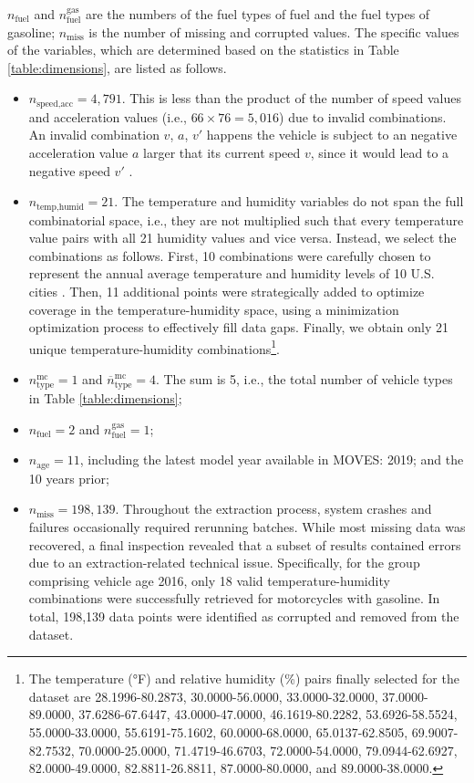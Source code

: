 \documentclass[12pt,english]{article}
\begin{document}
$n_\text{fuel}$ and $n_\text{fuel}^\text{gas}$ are the numbers of the fuel types of fuel and the fuel types of gasoline;
$n_\text{miss}$ is the number of missing and corrupted values.
The specific values of the variables, which are determined based on the statistics in Table \ref{table:dimensions}, are listed as follows.
\begin{itemize}
    \item \(n_\text{speed,acc} = 4,791\). This is less than the product of the number of speed values and acceleration values (i.e., \(66 \times 76 = 5,016\)) due to invalid combinations. An invalid combination $v$, $a$, $v'$ happens the vehicle is subject to an negative acceleration value $a$ larger that its current speed $v$, since it would lead to a negative speed $v'$ . 

    \item \( n_{\text{temp,humid}} = 21 \). The temperature and humidity variables do not span the full combinatorial space, i.e., they are not multiplied such that every temperature value pairs with all 21 humidity values and vice versa.
    Instead, we select the combinations as follows.
    First, 10 combinations were carefully chosen to represent the annual average temperature and humidity levels of 10 U.S. cities \citep{jayawardana2024intersectionzoo}. Then, 11 additional points were strategically added to optimize coverage in the temperature-humidity space, using a minimization optimization process to effectively fill data gaps.
    Finally, we obtain only 21 unique temperature-humidity combinations\footnote{The temperature (°F) and relative humidity (\%) pairs finally selected for the dataset are 28.1996-80.2873, 30.0000-56.0000, 33.0000-32.0000, 37.0000-89.0000, 37.6286-67.6447, 43.0000-47.0000, 46.1619-80.2282, 53.6926-58.5524, 55.0000-33.0000, 55.6191-75.1602, 60.0000-68.0000, 65.0137-62.8505, 69.9007-82.7532, 70.0000-25.0000, 71.4719-46.6703, 72.0000-54.0000, 79.0944-62.6927, 82.0000-49.0000, 82.8811-26.8811, 87.0000-80.0000, and 89.0000-38.0000.}.


    \item $n_\text{type}^\text{mc}=1$ and $\overline{n}_\text{type}^\text{mc}=4$. The sum is 5, i.e., the total number of vehicle types in Table \ref{table:dimensions};
    
    \item $n_\text{fuel}=2$ and $n_\text{fuel}^\text{gas}=1$;

    \item $n_\text{age}=11$, including the latest model year available in MOVES: 2019; and the 10 years prior; 
  
    \item \( n_{\text{miss}} = 198,139 \). Throughout the extraction process, system crashes and failures occasionally required rerunning batches. While most missing data was recovered, a final inspection revealed that a subset of results contained errors due to an extraction-related technical issue. Specifically, for the group comprising vehicle age 2016, only 18 valid temperature-humidity combinations were successfully retrieved for motorcycles with gasoline. In total, 198,139 data points were identified as corrupted and removed from the dataset.     
\end{itemize}
\end{document}
